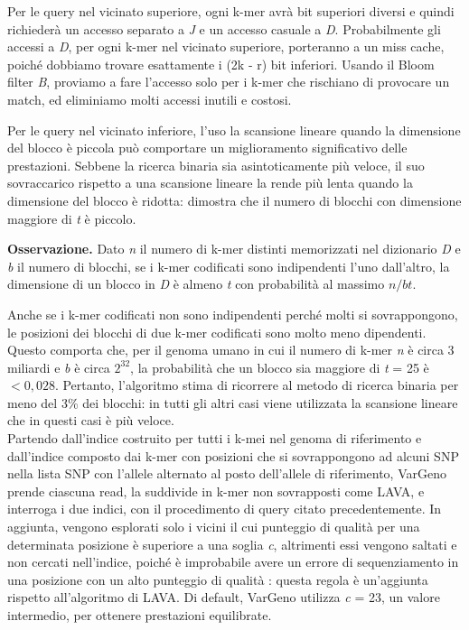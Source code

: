 \documentclass[../main.tex]{subfiles}
\begin{document}
Per le query nel vicinato superiore, ogni k-mer avrà bit superiori diversi e quindi richiederà un accesso separato a \textit{J} e un accesso casuale a \textit{D}. Probabilmente gli accessi a \textit{D}, per ogni k-mer nel vicinato superiore, porteranno a un miss cache, poiché dobbiamo trovare esattamente i (2k - r) bit inferiori. Usando il Bloom filter \textit{B}, proviamo a fare l’accesso solo per i k-mer che rischiano di provocare un match, ed eliminiamo molti accessi inutili e costosi.

Per le query nel vicinato inferiore, l’uso la scansione lineare quando la dimensione del blocco è piccola può comportare un miglioramento significativo delle prestazioni. Sebbene la ricerca binaria sia asintoticamente più veloce, il suo sovraccarico rispetto a una scansione lineare la rende più lenta quando la dimensione del blocco è ridotta: \cite{sun-medvedev2018vargeno} dimostra che il numero di blocchi con dimensione maggiore di \textit{t} è piccolo. 

\textbf{Osservazione.} Dato \textit{n} il numero di k-mer distinti memorizzati nel dizionario \textit{D} e \textit{b} il numero di blocchi, se i k-mer codificati sono indipendenti l'uno dall'altro, la dimensione di un blocco in \textit{D} è almeno \textit{t} con probabilità al massimo $n/bt$. 

Anche se i k-mer codificati non sono indipendenti perché molti si sovrappongono, le posizioni dei blocchi di due k-mer codificati sono molto meno dipendenti.  Questo comporta che, per il genoma umano in cui il numero di k-mer \textit{n} è circa 3 miliardi e \textit{b} è circa $2^{32}$, la probabilità che un blocco sia maggiore di \textit{t} = 25 è $<0,028$. Pertanto, l’algoritmo stima di ricorrere al metodo di ricerca binaria per meno del 3\% dei blocchi: in tutti gli altri casi viene utilizzata la scansione lineare che in questi casi è più veloce.\\

Partendo dall’indice costruito per tutti i k-mei nel genoma di riferimento e dall’indice composto dai k-mer con posizioni che si sovrappongono ad alcuni SNP nella lista SNP con l'allele alternato al posto dell’allele di riferimento, VarGeno prende ciascuna read, la suddivide in k-mer non sovrapposti come LAVA, e interroga i due indici, con il procedimento di query citato precedentemente. In aggiunta, vengono esplorati solo i vicini il cui punteggio di qualità per una determinata posizione è superiore a una soglia \textit{c}, altrimenti essi vengono saltati e non cercati nell’indice, poiché è improbabile avere un errore di sequenziamento in una posizione con un alto punteggio di qualità \cite{sun-medvedev2018vargeno}: questa regola è un’aggiunta rispetto all’algoritmo di LAVA. Di default, VarGeno utilizza \textit{c} = 23, un valore intermedio, per ottenere prestazioni equilibrate.
\end{document}
